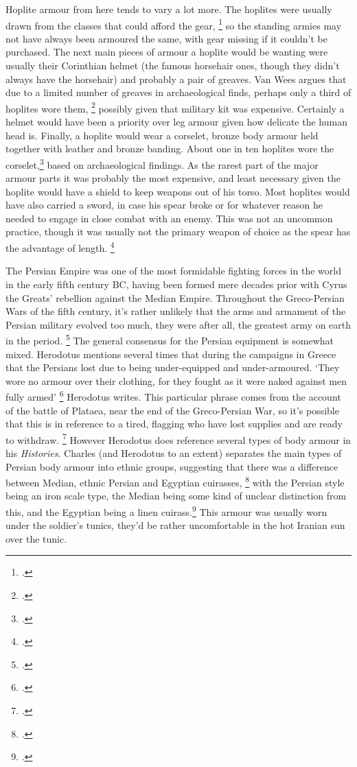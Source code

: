 \documentclass[twoside, a4paper, 12pt]{article}
\begin{document}
Hoplite armour from here tends to vary a lot more. The hoplites
were usually drawn from the classes that could afford the gear, \footcite[38]{wietzel_wheeler_1970}
so the standing armies may not have always been armoured the same, with gear
missing if it couldn't be purchased. The next main pieces of armour a hoplite
would be wanting were usually their Corinthian helmet (the famous horsehair
ones, though they didn't always have the horsehair) and probably a pair of greaves.
Van Wees argues that due to a limited number of greaves in archaeological finds,
perhaps only a third of hoplites wore them, \footcite[50]{wees_2004} possibly given
that military kit was expensive. Certainly a helmet would have been a priority
over leg armour given how delicate the human head is. Finally, a hoplite would
wear a corselet, bronze body armour held together with leather and bronze banding.
About one in ten hoplites wore the corselet,\footcite{wees_1997} based on
archaeological findings. As the rarest part of the major
armour parts it was probably the most expensive, and least necessary given the
hoplite would have a shield to keep weapons out of his torso. Most hoplites
would have also carried a sword, in case his spear broke or for whatever reason
he needed to engage in close combat with an enemy. This was not an uncommon
practice, though it was usually not the primary weapon of choice as the spear
has the advantage of length. \footcite{snodgrass_2006}

\par\vspace{1em}

The Persian Empire was one of the most formidable fighting forces in the world
in the early fifth century BC, having been formed mere decades prior with
Cyrus the Greats' rebellion against the Median Empire. Throughout the
Greco-Persian Wars of the fifth century, it's rather unlikely that the arms
and armament of the Persian military evolved too much, they were after all,
the greatest army on earth in the period. \footcite{kim_grecopersia_2017}
The general consensus for the Persian equipment is somewhat mixed.
Herodotus mentions several times that during the campaigns in Greece that
the Persians lost due to being under-equipped and under-armoured.
`They wore no armour over their clothing, for they fought as it were
naked against men fully armed' \footcite[Book 9.63.2]{herodotus_1920}
Herodotus writes. This particular phrase comes from the account of the battle
of Plataea, near the end of the Greco-Persian War, so it's possible that this
is in reference to a tired, flagging who have lost supplies and are ready
to withdraw. \footcite[267]{charles_bodyarmour_2012}
However Herodotus does reference several types of body armour in his \emph{Histories}.
Charles (and Herodotus to an extent) separates the main types of Persian body armour
into ethnic groups, suggesting that there was a difference between Median,
ethnic Persian and Egyptian cuirasses,
\footcite[Book 1.135]{herodotus_1920}
with the Persian style being an iron
scale type, the Median being some kind of unclear distinction from this, and
the Egyptian being a linen cuirass.\footcite[260-2]{charles_bodyarmour_2012}
This armour was usually worn under the soldier's tunics, they'd be rather
uncomfortable in the hot Iranian sun over the tunic.
\end{document}
